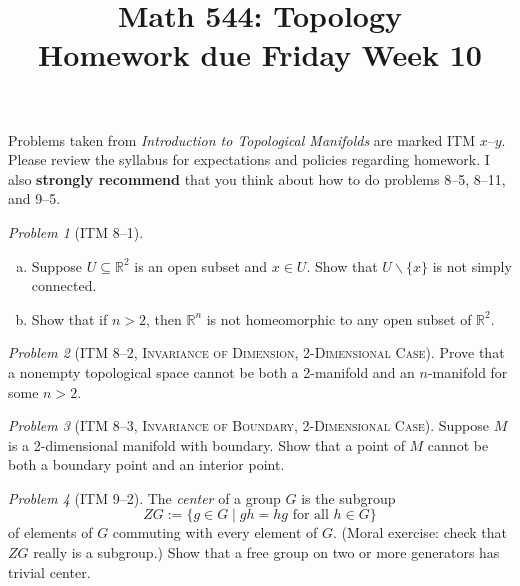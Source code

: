 \documentclass[11pt,twoside]{amsart}
\title{Math 544: Topology\\ Homework due Friday Week 10}
\theoremstyle{plain}
\theoremstyle{remark}
\newtheorem{prob}{Problem}
\theoremstyle{definition}
\theoremstyle{definition}
\newcommand{\RR}{\mathbb{R}}
\begin{document}
\maketitle

\noindent Problems taken from \emph{Introduction to Topological Manifolds} are marked ITM $x$--$y$. Please review the syllabus for expectations and policies regarding homework. I also \textbf{strongly recommend} that you think about how to do problems 8--5, 8--11, and 9--5.

\begin{prob}[ITM 8--1]
\begin{enumerate}[(a)]
\item Suppose $U\subseteq \RR^2$ is an open subset and $x\in U$. Show that $U\smallsetminus\{x\}$ is not simply connected.
\item Show that if $n>2$, then $\RR^n$ is not homeomorphic to any open subset of $\RR^2$.
\end{enumerate}
\end{prob}

\begin{prob}[ITM 8--2, \textsc{Invariance of Dimension, 2-Dimensional Case}]
Prove that a nonempty topological space cannot be both a 2-manifold and an $n$-manifold for some $n>2$.
\end{prob}

\begin{prob}[ITM 8--3, \textsc{Invariance of Boundary, 2-Dimensional Case}]
Suppose $M$ is a 2-dimensional manifold with boundary. Show that a point of $M$ cannot be both a boundary point and an interior point.
\end{prob}

\begin{prob}[ITM 9--2]
The \emph{center} of a group $G$ is the subgroup
\[
  ZG := \{g\in G\mid gh=hg\text{ for all }h\in G\}
\]
of elements of $G$ commuting with every element of $G$. (Moral exercise: check that $ZG$ really is a subgroup.) Show that a free group on two or more generators has trivial center.
\end{prob}
\end{document}
